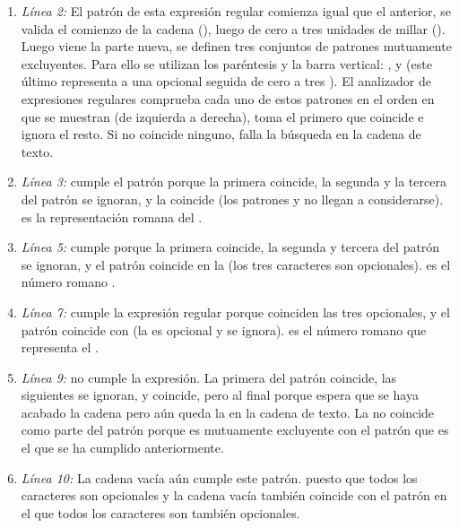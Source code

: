 \begin{enumerate}

\item \emph{Línea 2:} El patrón de esta expresión regular comienza igual que el anterior, se valida el comienzo de la cadena (\codigo{\^}), luego de cero a tres unidades de millar (). Luego viene la parte nueva, se definen tres conjuntos de patrones mutuamente excluyentes. Para ello se utilizan los paréntesis y la barra vertical: ,  y  (este último representa a una  opcional seguida de cero a tres ). El analizador de expresiones regulares comprueba cada uno de estos patrones en el orden en que se muestran (de izquierda a derecha), toma el primero que coincide e ignora el resto. Si no coincide ninguno, falla la búsqueda en la cadena de texto.

\item \emph{Línea 3:}  cumple el patrón porque la primera  coincide, la segunda y la tercera del patrón se ignoran, y la  coincide (los patrones  y  no llegan a considerarse).  es la representación romana del .

\item \emph{Línea 5:}  cumple porque la primera  coincide, la segunda y tercera  del patrón se ignoran, y el patrón  coincide en la  (los tres caracteres  son opcionales).  es el número romano .

\item \emph{Línea 7:}  cumple la expresión regular porque coinciden las tres  opcionales, y el patrón  coincide con  (la  es opcional y se ignora).  es el número romano que representa el .

\item \emph{Línea 9:}  no cumple la expresión. La primera  del patrón coincide, las siguientes se ignoran, y  coincide, pero al final \codigo{\$} porque espera que se haya acabado la cadena pero aún queda la  en la cadena de texto. La  no coincide como parte del patrón  porque es mutuamente excluyente con el patrón  que es el que se ha cumplido anteriormente.

\item \emph{Línea 10:} La cadena vacía aún cumple este patrón. puesto que todos los caracteres  son opcionales y la cadena vacía también coincide con el patrón  en el que todos los caracteres son también opcionales.

\end{enumerate}

